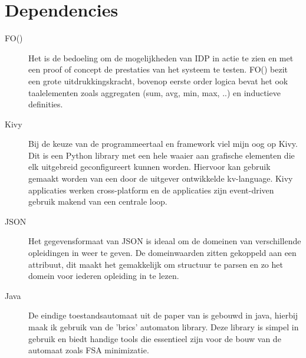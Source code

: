 \section{Dependencies}
\begin{description}
\item [FO(\textperiodcentered)] Het is de bedoeling om de mogelijkheden van IDP in actie te zien en met een proof of concept de prestaties van het systeem te testen. FO(\textperiodcentered) bezit een grote uitdrukkingskracht, bovenop eerste order logica bevat het ook taalelementen zoals aggregaten (sum, avg, min, max, ..) en inductieve definities.
\item [Kivy] Bij de keuze van de programmeertaal en framework viel mijn oog op Kivy. Dit is een Python library met een hele waaier aan grafische elementen die elk uitgebreid geconfigureert kunnen worden. Hiervoor kan gebruik gemaakt worden van een door de uitgever ontwikkelde kv-language. Kivy applicaties werken cross-platform en de applicaties zijn event-driven gebruik makend van een centrale loop.
\item [JSON] Het gegevensformaat van JSON is ideaal om de domeinen van verschillende opleidingen in weer te geven. De domeinwaarden zitten gekoppeld aan een attribuut, dit maakt het gemakkelijk om structuur te parsen en zo het domein voor iederen opleiding in te lezen.
\item [Java] De eindige toestandsautomaat uit de paper van \citep{amilhastre2002consistency} is gebouwd in java, hierbij maak ik gebruik van de 'brics' automaton library. Deze library is simpel in gebruik en biedt handige tools die essentieel zijn voor de bouw van de automaat zoals FSA minimizatie. 
\end{description}